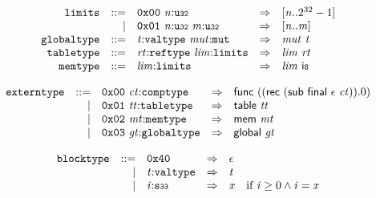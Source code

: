 \vspace{1ex}

$$
\begin{array}{@{}l@{}rrlll@{}l@{}}
& {\mathtt{limits}} &::=& \mathtt{0x00}~{\mathit{n}}{:}{\mathtt{u{\scriptstyle32}}} &\Rightarrow& [{\mathit{n}} .. {2^{32}} - 1] \\ &&|&
\mathtt{0x01}~{\mathit{n}}{:}{\mathtt{u{\scriptstyle32}}}~{\mathit{m}}{:}{\mathtt{u{\scriptstyle32}}} &\Rightarrow& [{\mathit{n}} .. {\mathit{m}}] \\
& {\mathtt{globaltype}} &::=& {\mathit{t}}{:}{\mathtt{valtype}}~{\mathit{mut}}{:}{\mathtt{mut}} &\Rightarrow& {\mathit{mut}}~{\mathit{t}} \\
& {\mathtt{tabletype}} &::=& {\mathit{rt}}{:}{\mathtt{reftype}}~{\mathit{lim}}{:}{\mathtt{limits}} &\Rightarrow& {\mathit{lim}}~{\mathit{rt}} \\
& {\mathtt{memtype}} &::=& {\mathit{lim}}{:}{\mathtt{limits}} &\Rightarrow& {\mathit{lim}}~\mathsf{i{\scriptstyle8}} \\
\end{array}
$$

\vspace{1ex}

$$
\begin{array}{@{}l@{}rrlll@{}l@{}}
& {\mathtt{externtype}} &::=& \mathtt{0x00}~{\mathit{ct}}{:}{\mathtt{comptype}} &\Rightarrow& \mathsf{func}~((\mathsf{rec}~(\mathsf{sub}~\mathsf{final}~\epsilon~{\mathit{ct}})) . 0) \\ &&|&
\mathtt{0x01}~{\mathit{tt}}{:}{\mathtt{tabletype}} &\Rightarrow& \mathsf{table}~{\mathit{tt}} \\ &&|&
\mathtt{0x02}~{\mathit{mt}}{:}{\mathtt{memtype}} &\Rightarrow& \mathsf{mem}~{\mathit{mt}} \\ &&|&
\mathtt{0x03}~{\mathit{gt}}{:}{\mathtt{globaltype}} &\Rightarrow& \mathsf{global}~{\mathit{gt}} \\
\end{array}
$$

\vspace{1ex}

\vspace{1ex}

$$
\begin{array}{@{}l@{}rrlll@{}l@{}}
& {\mathtt{blocktype}} &::=& \mathtt{0x40} &\Rightarrow& \epsilon \\ &&|&
{\mathit{t}}{:}{\mathtt{valtype}} &\Rightarrow& {\mathit{t}} \\ &&|&
{\mathit{i}}{:}{\mathtt{s{\scriptstyle33}}} &\Rightarrow& {\mathit{x}} &\quad
  \mbox{if}~{\mathit{i}} \geq 0 \land {\mathit{i}} = {\mathit{x}} \\
\end{array}
$$

